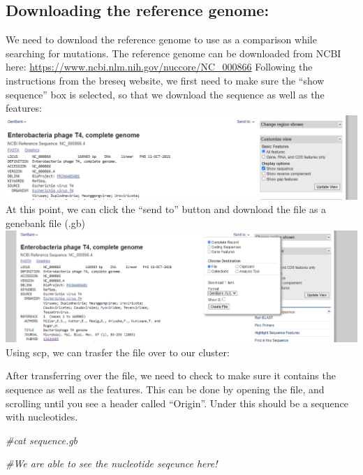 \documentclass[
]{article}
\newenvironment{Shaded}{\begin{snugshade}}{\end{snugshade}}
\newcommand{\CommentTok}[1]{\textcolor[rgb]{0.56,0.35,0.01}{\textit{#1}}}
\begin{document}
\hypertarget{downloading-the-reference-genome}{%
\subsection{Downloading the reference
genome:}\label{downloading-the-reference-genome}}

We need to download the reference genome to use as a comparison while
searching for mutations. The reference genome can be downloaded from
NCBI here: \url{https://www.ncbi.nlm.nih.gov/nuccore/NC_000866}
Following the instructions from the breseq website, we first need to
make sure the ``show sequence'' box is selected, so that we download the
sequence as well as the features: \includegraphics{GenBank.png} At this
point, we can click the ``send to'' button and download the file as a
genebank file (.gb) \includegraphics{GenBankDownload.png} Using scp, we
can trasfer the file over to our cluster:

After transferring over the file, we need to check to make sure it
contains the sequence as well as the features. This can be done by
opening the file, and scrolling until you see a header called
``Origin''. Under this should be a sequence with nucleotides.

\begin{Shaded}
\begin{Highlighting}[]
\CommentTok{#cat sequence.gb}

\CommentTok{#We are able to see the nucleotide seqeunce here!}
\end{Highlighting}
\end{Shaded}
\end{document}
